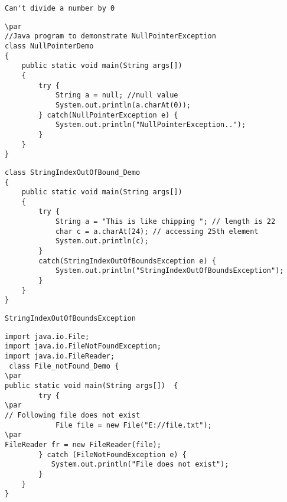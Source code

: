 \documentclass{book}
\def\lthtmlcheckvsize{\ifdim\ht\sizebox<\vsize 
  \ifdim\wd\sizebox<\hsize\expandafter\hfill\fi \expandafter\vfill
  \else\expandafter\vss\fi}%
\begin{document}
{\newpage\clearpage
{}%
\begin{lstlisting}
Can't divide a number by 0
\end{lstlisting}%
\lthtmlfigureZ
\lthtmlcheckvsize\clearpage}

{\newpage\clearpage
{}%
\begin{lstlisting}
\par
//Java program to demonstrate NullPointerException 
class NullPointerDemo 
{ 
    public static void main(String args[]) 
    { 
        try { 
            String a = null; //null value 
            System.out.println(a.charAt(0)); 
        } catch(NullPointerException e) { 
            System.out.println("NullPointerException.."); 
        } 
    } 
} 
\end{lstlisting}%
\lthtmlfigureZ
\lthtmlcheckvsize\clearpage}

{\newpage\clearpage
{}%
\begin{lstlisting}
class StringIndexOutOfBound_Demo 
{ 
    public static void main(String args[]) 
    { 
        try { 
            String a = "This is like chipping "; // length is 22 
            char c = a.charAt(24); // accessing 25th element 
            System.out.println(c); 
        } 
        catch(StringIndexOutOfBoundsException e) { 
            System.out.println("StringIndexOutOfBoundsException"); 
        } 
    } 
} 
\end{lstlisting}%
\lthtmlfigureZ
\lthtmlcheckvsize\clearpage}

{\newpage\clearpage
{}%
\begin{lstlisting}
StringIndexOutOfBoundsException
\end{lstlisting}%
\lthtmlfigureZ
\lthtmlcheckvsize\clearpage}

{\newpage\clearpage
{}%
\begin{lstlisting}
import java.io.File; 
import java.io.FileNotFoundException; 
import java.io.FileReader; 
 class File_notFound_Demo { 
\par
public static void main(String args[])  { 
        try { 
\par
// Following file does not exist 
            File file = new File("E://file.txt"); 
\par
FileReader fr = new FileReader(file); 
        } catch (FileNotFoundException e) { 
           System.out.println("File does not exist"); 
        } 
    } 
} 
\end{lstlisting}%
\lthtmlfigureZ
\lthtmlcheckvsize\clearpage}
\end{document}
